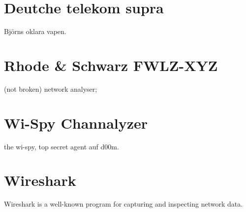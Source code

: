 \section{Deutche telekom supra}

Björns oklara vapen.

\section{Rhode \& Schwarz FWLZ-XYZ}

(not broken) network analyser;

\section{Wi-Spy Channalyzer}

the wi-spy, top secret agent auf d00m.

\section{Wireshark}

Wireshark is a well-known program for capturing and inspecting network data.

